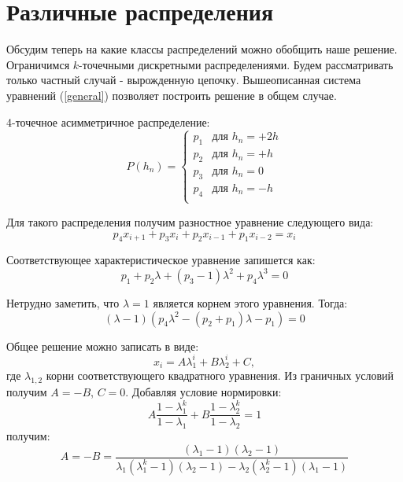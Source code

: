\section{Различные распределения}
Обсудим теперь на какие классы распределений можно обобщить наше решение. Ограничимся $k$-точечными дискретными распределениями.
Будем рассматривать только частный случай - вырожденную цепочку. Вышеописанная система уравнений (\ref{general}) позволяет построить решение в общем случае.

4-точечное асимметричное распределение:
\begin{equation*}
P(h_n) =
\begin{cases}
p_1 &\mbox{для } h_n= +2h \\
p_2 &\mbox{для } h_n= +h \\
p_3 &\mbox{для } h_n= 0\\
p_4 &\mbox{для } h_n = -h\\
\end{cases}
\end{equation*}

Для такого распределения получим разностное уравнение следующего вида:
\begin{equation}
	p_4 x_{i+1} + p_3 x_{i} + p_2 x_{i-1} +p_1 x_{i-2} = x_{i}
\end{equation}

Соответствующее характеристическое уравнение запишется как:
\begin{equation}
	p_1+ p_2\lambda + (p_3-1) \lambda^2 + p_4 \lambda^3 = 0
\end{equation}

Нетрудно заметить, что $\lambda=1$ является корнем этого уравнения. Тогда:
\begin{equation}
(\lambda - 1)(p_4 \lambda^2 - (p_2 + p_1)\lambda - p_1	) =0
\end{equation}

Общее решение можно записать в виде:
\begin{equation}
x_i = A \lambda_1^i + B \lambda_2^i + C,
\end{equation}
где $\lambda_{1,2}$ корни соответствующего квадратного уравнения.
Из граничных условий получим $A=-B$, $C=0$. Добавляя условие нормировки:
\begin{equation}
A \frac{1-\lambda_1^k}{1-\lambda_1} + B \frac{1-\lambda_2^k}{1-\lambda_2} =1
\end{equation}
получим:
\begin{equation*}
A=-B = \frac{(\lambda_1-1)(\lambda_2-1)}{\lambda_1(\lambda_1^k-1)(\lambda_2-1) - \lambda_2(\lambda_2^k-1)(\lambda_1-1)}
\end{equation*}

